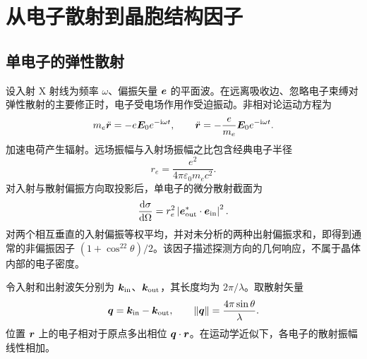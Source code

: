 \chapter{从电子散射到晶胞结构因子}
\label{ch:scattering}
\section{单电子的弹性散射}
设入射 X 射线为频率 $\omega$、偏振矢量 $\bm{e}$ 的平面波。在远离吸收边、忽略电子束缚对弹性散射的主要修正时，电子受电场作用作受迫振动。非相对论运动方程为
\begin{equation}
m_e\ddot{\bm{r}}=-e\bm{E}_0 e^{-\mathrm{i}\omega t},\qquad
\ddot{\bm{r}}=-\frac{e}{m_e}\bm{E}_0 e^{-\mathrm{i}\omega t}.
\end{equation}
加速电荷产生辐射。远场振幅与入射场振幅之比包含经典电子半径
\begin{equation}
r_e=\frac{e^2}{4\pi\varepsilon_0m_ec^2}.
\end{equation}
对入射与散射偏振方向取投影后，单电子的微分散射截面为
\begin{equation}
\frac{\mathrm{d}\sigma}{\mathrm{d}\Omega}=r_e^2
\left|\bm{e}_{\mathrm{out}}^{*}\cdot\bm{e}_{\mathrm{in}}\right|^2.
\end{equation}
对两个相互垂直的入射偏振等权平均，并对未分析的两种出射偏振求和，即得到通常的非偏振因子 $(1+\cos^22\theta)/2$。该因子描述探测方向的几何响应，不属于晶体内部的电子密度。

令入射和出射波矢分别为 $\bm{k}_{\mathrm{in}}$、$\bm{k}_{\mathrm{out}}$，其长度均为 $2\pi/\lambda$。取散射矢量
\begin{equation}
\bm{q}=\bm{k}_{\mathrm{in}}-\bm{k}_{\mathrm{out}},\qquad
\lVert\bm{q}\rVert=\frac{4\pi\sin\theta}{\lambda}.
\end{equation}
位置 $\bm{r}$ 上的电子相对于原点多出相位 $\bm{q}\cdot\bm{r}$。在运动学近似下，各电子的散射振幅线性相加。

